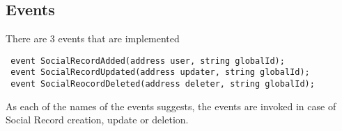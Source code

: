 \subsection{Events}
There are 3 events that are implemented
\begin{lstlisting}
 event SocialRecordAdded(address user, string globalId);
 event SocialRecordUpdated(address updater, string globalId);
 event SocialReocordDeleted(address deleter, string globalId);
\end{lstlisting}
As each of the names of the events suggests, the events are invoked in case of Social Record creation, update or deletion.

